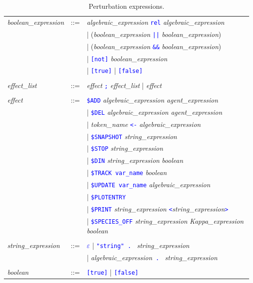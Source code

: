 \documentclass[11pt]{book}
\def\tcb#1{\textcolor{blue}{\ttt{#1}}}
\def\ttt#1{\texttt{#1}}
\def\var#1{{\textquotesingle}#1{\textquotesingle}}
\begin{document}
\begin{table}[htbp]
  \centering
  \caption{Perturbation expressions.}
  \begin{tabular}{@{} lcl @{}}
    \textit{boolean\_expression} &::=& \textit{algebraic\_expression}\index{boolean expression} \tcb{rel} \textit{algebraic\_expression} \\
    && | (\textit{boolean\_expression} \tcb{||} \textit{boolean\_expression}) \\
    && | (\textit{boolean\_expression} \tcb{\&\&} \textit{boolean\_expression}) \\
    && | \tcb{[not]} \textit{boolean\_expression} \\
    && | \tcb{[true]} | \tcb{[false]} \\\\
    \textit{effect\_list} &::=& \textit{effect} \tcb{\ttt {;}} \textit{effect\_list} | \textit{effect} \\\\
\textit{effect} &::=& \tcb{\$ADD} \textit{algebraic\_expression agent\_expression} \\
    && | \tcb{\$DEL} \textit{algebraic\_expression agent\_expression} \\
    && | \textit{token\_name} \tcb{<-} \textit{algebraic\_expression} \\
    && | \tcb{\$SNAPSHOT} \textit{string\_expression}\\
    && | \tcb{\$STOP} \textit{string\_expression}\\
	&& | \tcb{\$DIN} \textit{string\_expression} \textit{boolean} \\
    && | \tcb{\$TRACK \var{var\_name}} \textit{boolean} \\
    && | \tcb{\$UPDATE \var{var\_name}} \textit{algebraic\_expression} \\
    && | \tcb{\$PLOTENTRY} \\
    && | \tcb{\$PRINT} \textit{string\_expression} \tcb{<}\textit{string\_expression}\tcb{>} \\
    && | \tcb{\$SPECIES\_OFF} \textit{string\_expression} \textit{Kappa\_expression} \textit{boolean} \\
    \\
    \textit{string\_expression} &::=& \tcb{$\varepsilon$} | \tcb{"string" . } \textit{string\_expression} \\
    && | \textit{algebraic\_expression}\tcb{ . } \textit{string\_expression} \\\\
	\textit{boolean} &::=& \tcb{[true]} | \tcb{[false]}
  \end{tabular}
  \label{tab:pert}
\end{table}
\end{document}
